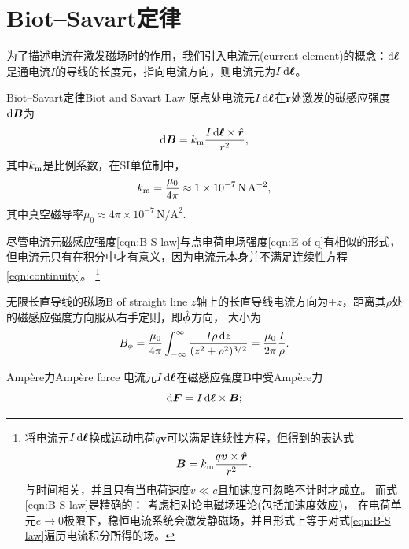 \section{Biot--Savart定律}
\label{sec:Biot-Savart law}

为了描述电流在激发磁场时的作用，我们引入电流元(current element)的概念：$\mathop{}\!\mathrm{d}\bm\ell$是通电流$I$的导线的长度元，指向电流方向，则电流元为$I\mathop{}\!\mathrm{d}\bm\ell$。
\begin{theorem}{Biot--Savart定律}{Biot and Savart Law}
    原点处电流元$I\mathop{}\!\mathrm{d}\bm\ell$在$\bm r$处激发的磁感应强度$\mathop{}\!\mathrm{d}\bm B$为
    \begin{equation}
        \label{eqn:B-S law}
        \mathop{}\!\mathrm{d}\bm B = k_\mathrm m\frac{I\mathop{}\!\mathrm{d}\bm\ell \times \mathop{}\!\hat{\bm{r}}}{r^2},
    \end{equation}
    其中$k_\mathrm m$是比例系数，在SI单位制中，
    \[
        k_\mathrm m = \frac{\mu_0}{4\pi} \approx \qty{1e-7}{\newton\per\ampere\squared},
    \]
    其中真空磁导率$\mu_0 \approx 4\pi \times {10^{-7}}\,\unit{\newton\per\ampere\squared}.$
\end{theorem}
\begin{remark}
    尽管电流元磁感应强度\eqref{eqn:B-S law}与点电荷电场强度\eqref{eqn:E of q}有相似的形式，但电流元只有在积分中才有意义，因为电流元本身并不满足连续性方程\eqref{eqn:continuity}。
    \footnote{将电流元$I\mathop{}\!\mathrm{d}\bm\ell$换成运动电荷$q\bm v$可以满足连续性方程，但得到的表达式
    \[
        \bm B = k_\mathrm m\frac{q\bm v \times \mathop{}\!\hat{\bm{r}}}{r^2}.
    \]
    与时间相关，并且只有当电荷速度$v \ll c$且加速度可忽略不计时才成立。
    而式\eqref{eqn:B-S law}是精确的：
    考虑相对论电磁场理论(包括加速度效应)，
    在电荷单元$e \to 0$极限下，稳恒电流系统会激发静磁场，并且形式上等于对式\eqref{eqn:B-S law}遍历电流积分所得的场。}
\end{remark}
\begin{example}{无限长直导线的磁场}{B of straight line}
    $z$轴上的长直导线电流方向为$+z$，距离其$\rho$处的磁感应强度方向服从右手定则，即$\mathop{}\!\hat{\bm{\phi}}$方向，
    大小为
    \begin{equation}
        \label{eq:ed-infinite-wire-biot-savart}
        B_\phi = \frac{\mu_0}{4\pi}\int_{-\infty}^\infty\frac{I\rho\mathop{}\!\mathrm{d} z}{(z^2 + \rho^2)^{3/2}} = \frac{\mu_0}{2\pi}\frac I\rho.
    \end{equation}
\end{example}

\begin{theorem}
    {Ampère力}{Ampère force}
    电流元$I\mathop{}\!\mathrm{d}\bm\ell$在磁感应强度$\bm B$中受Ampère力
    \begin{equation}
        \mathop{}\!\mathrm{d}\bm F = I\mathop{}\!\mathrm{d}\bm\ell \times \bm B;
    \end{equation}
\end{theorem}

